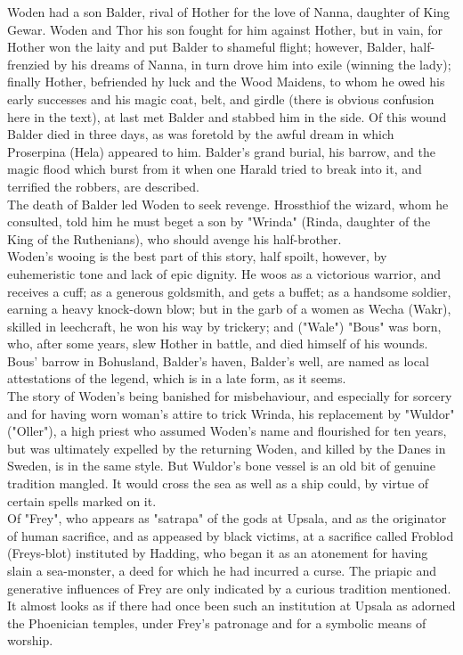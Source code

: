 \documentclass[10pt,a4paper]{report}
\begin{document}
Woden had a son Balder, rival of Hother for the love of Nanna, daughter of King Gewar. Woden and Thor his son fought for him against Hother, but in vain, for Hother won the laity and put Balder to shameful flight; however, Balder, half-frenzied by his dreams of Nanna, in turn drove him into exile (winning the lady); finally Hother, befriended hy luck and the Wood Maidens, to whom he owed his early successes and his magic coat, belt, and girdle (there is obvious confusion here in the text), at last met Balder and stabbed him in the side. Of this wound Balder died in three days, as was foretold by the awful dream in which Proserpina (Hela) appeared to him. Balder's grand burial, his barrow, and the magic flood which burst from it when one Harald tried to break into it, and terrified the robbers, are described.\\

The death of Balder led Woden to seek revenge. Hrossthiof the wizard, whom he consulted, told him he must beget a son by "Wrinda" (Rinda, daughter of the King of the Ruthenians), who should avenge his half-brother.\\

Woden's wooing is the best part of this story, half spoilt, however, by euhemeristic tone and lack of epic dignity. He woos as a victorious warrior, and receives a cuff; as a generous goldsmith, and gets a buffet; as a handsome soldier, earning a heavy knock-down blow; but in the garb of a women as Wecha (Wakr), skilled in leechcraft, he won his way by trickery; and ("Wale") "Bous" was born, who, after some years, slew Hother in battle, and died himself of his wounds. Bous' barrow in Bohusland, Balder's haven, Balder's well, are named as local attestations of the legend, which is in a late form, as it seems.\\

The story of Woden's being banished for misbehaviour, and especially for sorcery and for having worn woman's attire to trick Wrinda, his replacement by "Wuldor" ("Oller"), a high priest who assumed Woden's name and flourished for ten years, but was ultimately expelled by the returning Woden, and killed by the Danes in Sweden, is in the same style. But Wuldor's bone vessel is an old bit of genuine tradition mangled. It would cross the sea as well as a ship could, by virtue of certain spells marked on it.\\

Of "Frey", who appears as "satrapa" of the gods at Upsala, and as the originator of human sacrifice, and as appeased by black victims, at a sacrifice called Froblod (Freys-blot) instituted by Hadding, who began it as an atonement for having slain a sea-monster, a deed for which he had incurred a curse. The priapic and generative influences of Frey are only indicated by a curious tradition mentioned. It almost looks as if there had once been such an institution at Upsala as adorned the Phoenician temples, under Frey's patronage and for a symbolic means of worship.\\
\end{document}
